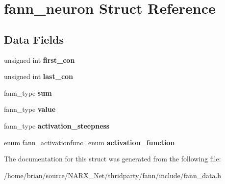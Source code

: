 \hypertarget{structfann__neuron}{\section{fann\-\_\-neuron Struct Reference}
\label{structfann__neuron}
}
\subsection*{Data Fields}
\begin{DoxyCompactItemize}
\item 
\hypertarget{structfann__neuron_afa3b3b9384a65c144da78367df247399}{unsigned int {\bfseries first\-\_\-con}}\label{structfann__neuron_afa3b3b9384a65c144da78367df247399}

\item 
\hypertarget{structfann__neuron_a8d40f403df2971c8438ff4d033e1b3d7}{unsigned int {\bfseries last\-\_\-con}}\label{structfann__neuron_a8d40f403df2971c8438ff4d033e1b3d7}

\item 
\hypertarget{structfann__neuron_a2dfb7d6e04b1bf544e2fdf47d6aa29ce}{fann\-\_\-type {\bfseries sum}}\label{structfann__neuron_a2dfb7d6e04b1bf544e2fdf47d6aa29ce}

\item 
\hypertarget{structfann__neuron_ae0ebb6c4f0466b4d093a2aed289534d8}{fann\-\_\-type {\bfseries value}}\label{structfann__neuron_ae0ebb6c4f0466b4d093a2aed289534d8}

\item 
\hypertarget{structfann__neuron_a4543777b783190bb1eca85dc8b86f945}{fann\-\_\-type {\bfseries activation\-\_\-steepness}}\label{structfann__neuron_a4543777b783190bb1eca85dc8b86f945}

\item 
\hypertarget{structfann__neuron_a18a998b2d4092f33f98b2fb5130e30c3}{enum fann\-\_\-activationfunc\-\_\-enum {\bfseries activation\-\_\-function}}\label{structfann__neuron_a18a998b2d4092f33f98b2fb5130e30c3}

\end{DoxyCompactItemize}


The documentation for this struct was generated from the following file\-:\begin{DoxyCompactItemize}
\item 
/home/brian/source/\-N\-A\-R\-X\-\_\-\-Net/thridparty/fann/include/fann\-\_\-data.\-h\end{DoxyCompactItemize}

